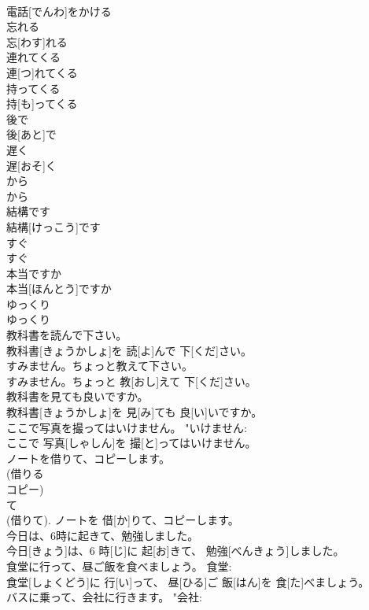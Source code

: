 \documentclass[8pt]{extreport}
\begin{document}
\begin{CJK}{UTF8}{min}
\\	電話[でんわ]をかける		
\\	忘れる	
\\	忘[わす]れる		
\\	連れてくる	
\\	連[つ]れてくる		
\\	持ってくる	
\\	持[も]ってくる		
\\	後で	
\\	後[あと]で		
\\	遅く	
\\	遅[おそ]く		
\\	から	
\\	から		
\\	結構です	
\\	結構[けっこう]です		
\\	すぐ	
\\	すぐ		
\\	本当ですか	
\\	本当[ほんとう]ですか		
\\	ゆっくり	
\\	ゆっくり		
\\	教科書を読んで下さい。	
\\	教科書[きょうかしょ]を 読[よ]んで 下[くだ]さい。	
\\	すみません。ちょっと教えて下さい。	
\\	すみません。ちょっと 教[おし]えて 下[くだ]さい。	
\\	教科書を見ても良いですか。	
\\	教科書[きょうかしょ]を 見[み]ても 良[い]いですか。	
\\	ここで写真を撮ってはいけません。	"いけません: 
\\	ここで 写真[しゃしん]を 撮[と]ってはいけません。		
\\	ノートを借りて、コピーします。	
\\	(借りる 
\\	コピー) 
\\	て 
\\	(借りて).	ノートを 借[か]りて、コピーします。	
\\	今日は、6時に起きて、勉強しました。	
\\	今日[きょう]は、6 時[じ]に 起[お]きて、 勉強[べんきょう]しました。	
\\	食堂に行って、昼ご飯を食べましょう。	食堂: 
\\	食堂[しょくどう]に 行[い]って、 昼[ひる]ご 飯[はん]を 食[た]べましょう。	
\\	バスに乗って、会社に行きます。	"会社: 

\end{CJK}
\end{document}

